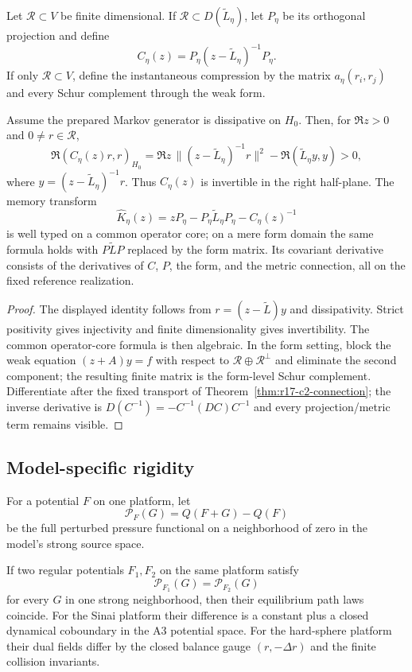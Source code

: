 Let $\mathcal R\subset V$ be finite dimensional.  If
$\mathcal R\subset D(\widetilde L_\eta)$, let
$P_\eta$ be its orthogonal projection and define
\[
 C_\eta(z)=P_\eta(z-\widetilde L_\eta)^{-1}P_\eta.
\]
If only $\mathcal R\subset V$, define the instantaneous compression by the
matrix $a_\eta(r_i,r_j)$ and every Schur complement through the weak form.

\begin{theorem}
\label{thm:r17-c2-memory}
Assume the prepared Markov generator is dissipative on $H_0$.  Then, for
$\Re z>0$ and $0\ne r\in\mathcal R$,
\[
 \Re(C_\eta(z)r,r)_{H_0}
 =\Re z\,\|(z-\widetilde L_\eta)^{-1}r\|^2
 -\Re(\widetilde L_\eta y,y)>0,
\]
where $y=(z-\widetilde L_\eta)^{-1}r$.  Thus
$C_\eta(z)$ is invertible in the right half-plane.  The memory transform
\[
 \widehat K_\eta(z)
 =zP_\eta-P_\eta\widetilde L_\eta P_\eta
 -C_\eta(z)^{-1}
\]
is well typed on a common operator core; on a mere form domain the same
formula holds with $P\widetilde LP$ replaced by the form matrix.  Its
covariant derivative consists of the derivatives of $C$, $P$, the form, and
the metric connection, all on the fixed reference realization.
\end{theorem}

\begin{proof}
The displayed identity follows from $r=(z-\widetilde L)y$ and
dissipativity.  Strict positivity gives injectivity and finite dimensionality
gives invertibility.  The common operator-core formula is then algebraic.  In
the form setting, block the weak equation
$(z+A)y=f$ with respect to $\mathcal R\oplus\mathcal R^\perp$ and
eliminate the second component; the resulting finite matrix is the form-level
Schur complement.  Differentiate after the fixed transport of
Theorem~\ref{thm:r17-c2-connection}; the inverse derivative is
$D(C^{-1})=-C^{-1}(DC)C^{-1}$ and every projection/metric term remains
visible.
\end{proof}

\subsection{Model-specific rigidity}

For a potential $F$ on one platform, let
\[
 \mathcal P_F(G)=Q(F+G)-Q(F)
\]
be the full perturbed pressure functional on a neighborhood of zero in the
model's strong source space.

\begin{theorem}
\label{thm:r17-c2-rigidity}
If two regular potentials $F_1,F_2$ on the same platform satisfy
\[
 \mathcal P_{F_1}(G)=\mathcal P_{F_2}(G)
\]
for every $G$ in one strong neighborhood, then their equilibrium path laws
coincide.  For the Sinai platform their difference is a constant plus a closed
dynamical coboundary in the A3 potential space.  For the hard-sphere platform
their dual fields differ by the closed balance gauge
$(r,-\Delta r)$ and the finite collision invariants.
\end{theorem}

